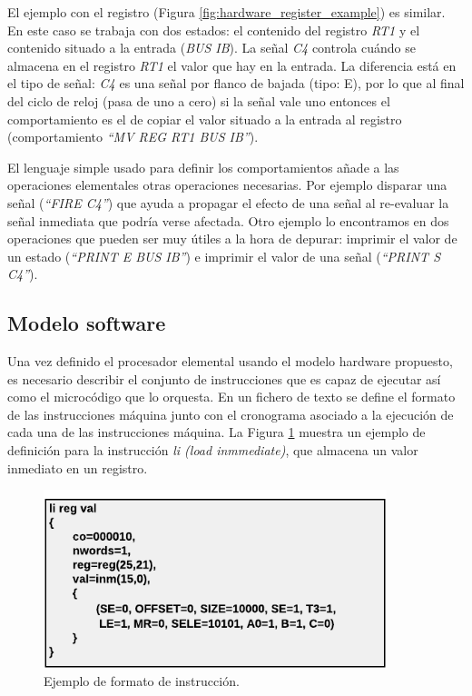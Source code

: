 El ejemplo con el registro (Figura \ref{fig:hardware_register_example}) es similar. En este caso se trabaja con dos estados: el contenido del registro \emph{RT1} y el contenido situado a la entrada (\emph{BUS IB}). La señal \emph{C4} controla cuándo se almacena en el registro \emph{RT1} el valor que hay en la entrada. La diferencia está en el tipo de señal: \emph{C4} es una señal por flanco de bajada (tipo: E), por lo que al final del ciclo de reloj (pasa de uno a cero) si la señal vale uno entonces el comportamiento es el de copiar el valor situado a la entrada al registro (comportamiento \emph{``MV REG RT1 BUS IB''}).

El lenguaje simple usado para definir los comportamientos añade a las operaciones elementales otras operaciones necesarias. Por ejemplo disparar una señal (\emph{``FIRE C4''}) que ayuda a propagar el efecto de una señal al re-evaluar la señal inmediata que podría verse afectada. Otro ejemplo lo encontramos en dos operaciones que pueden ser muy útiles a la hora de depurar: imprimir el valor de un estado (\emph{``PRINT E BUS IB''}) e imprimir el valor de una señal (\emph{``PRINT S C4''}).

\subsection{Modelo software}

Una vez definido el procesador elemental usando el modelo hardware propuesto, es necesario describir el conjunto de instrucciones que es capaz de ejecutar así como el microcódigo que lo orquesta. En un fichero de texto se define el formato de las instrucciones máquina junto con el cronograma asociado a la ejecución de cada una de las instrucciones máquina. La Figura \ref{fig:software_format_example} muestra un ejemplo de definición para la instrucción \emph{li (load inmmediate)}, que almacena un valor inmediato en un registro.

\begin{figure}[htbp]
 	\centering
 	\includegraphics[width=10cm]{figures/instruction_example}
 	\caption{Ejemplo de formato de instrucción.}
	\label{fig:software_format_example}
\end{figure}

